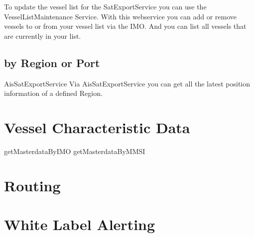 To update the vessel list for the SatExportService you can use the VesselListMaintenance Service.
With this webservice you can add or remove vessels to or from your vessel list via the IMO.
And you can list all vessels that are currently in your list. 



\subsection{by Region or Port}
AisSatExportService
Via AisSatExportService you can get all the latest position information of a defined Region.

   


\section{Vessel Characteristic Data}
getMasterdataByIMO
getMasterdataByMMSI

\section{Routing}

\section{White Label Alerting}
